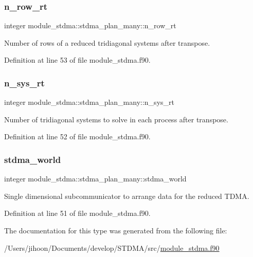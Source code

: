 \subsubsection{\texorpdfstring{n\_row\_rt}{n\_row\_rt}}
{\footnotesize\ttfamily integer module\+\_\+stdma\+::stdma\+\_\+plan\+\_\+many\+::n\+\_\+row\+\_\+rt}



Number of rows of a reduced tridiagonal systems after transpose. 



Definition at line 53 of file module\+\_\+stdma.\+f90.

\mbox{\label{structmodule__stdma_1_1stdma__plan__many_a53ea9079aa233209ed3079699ca5189d}} 
\subsubsection{\texorpdfstring{n\_sys\_rt}{n\_sys\_rt}}
{\footnotesize\ttfamily integer module\+\_\+stdma\+::stdma\+\_\+plan\+\_\+many\+::n\+\_\+sys\+\_\+rt}



Number of tridiagonal systems to solve in each process after transpose. 



Definition at line 52 of file module\+\_\+stdma.\+f90.

\mbox{\label{structmodule__stdma_1_1stdma__plan__many_a047841250c4299bb9ae46f6793547f9e}} 
\subsubsection{\texorpdfstring{stdma\_world}{stdma\_world}}
{\footnotesize\ttfamily integer module\+\_\+stdma\+::stdma\+\_\+plan\+\_\+many\+::stdma\+\_\+world}



Single dimensional subcommunicator to arrange data for the reduced T\+D\+MA. 



Definition at line 51 of file module\+\_\+stdma.\+f90.



The documentation for this type was generated from the following file\+:\begin{DoxyCompactItemize}
\item 
/\+Users/jihoon/\+Documents/develop/\+S\+T\+D\+M\+A/src/\mbox{\hyperlink{module__stdma_8f90}{module\+\_\+stdma.\+f90}}\end{DoxyCompactItemize}
